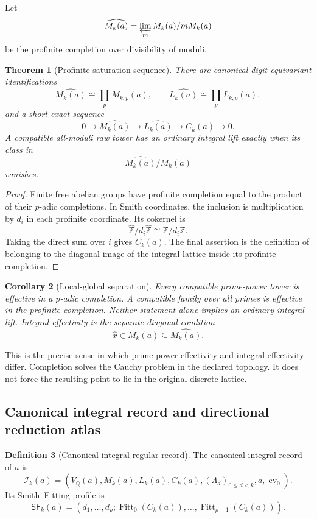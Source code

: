 \documentclass[11pt]{article}
\newtheorem{theorem}{Theorem}[section]
\newtheorem{corollary}[theorem]{Corollary}
\theoremstyle{definition}
\newtheorem{definition}[theorem]{Definition}
\theoremstyle{remark}
\begin{document}
Let
\[
\widehat{M_k(a)}
=
\varprojlim_m M_k(a)/mM_k(a)
\]
be the profinite completion over divisibility of moduli.

\begin{theorem}[Profinite saturation sequence]
\label{thm:block06-profinite}
There are canonical digit-equivariant identifications
\[
\widehat{M_k(a)}
\cong
\prod_p M_{k,p}(a),
\qquad
\widehat{L_k(a)}
\cong
\prod_p L_{k,p}(a),
\]
and a short exact sequence
\[
0
\longrightarrow
\widehat{M_k(a)}
\longrightarrow
\widehat{L_k(a)}
\longrightarrow
C_k(a)
\longrightarrow
0.
\]
A compatible all-moduli raw tower has an ordinary integral lift exactly when its class in
\[
\widehat{M_k(a)}/M_k(a)
\]
vanishes.
\end{theorem}

\begin{proof}
Finite free abelian groups have profinite completion equal to the product of their \(p\)-adic completions.  In Smith coordinates, the inclusion is multiplication by \(d_i\) in each profinite coordinate.  Its cokernel is
\[
\widehat{\mathbb Z}/d_i\widehat{\mathbb Z}
\cong
\mathbb Z/d_i\mathbb Z.
\]
Taking the direct sum over \(i\) gives \(C_k(a)\).  The final assertion is the definition of belonging to the diagonal image of the integral lattice inside its profinite completion.
\end{proof}

\begin{corollary}[Local-global separation]
\label{cor:block06-local-global}
Every compatible prime-power tower is effective in a \(p\)-adic completion.  A compatible family over all primes is effective in the profinite completion.  Neither statement alone implies an ordinary integral lift.  Integral effectivity is the separate diagonal condition
\[
\widehat{x}\in M_k(a)\subseteq\widehat{M_k(a)}.
\]
\end{corollary}

This is the precise sense in which prime-power effectivity and integral effectivity differ.  Completion solves the Cauchy problem in the declared topology.  It does not force the resulting point to lie in the original discrete lattice.

\subsection{Canonical integral record and directional reduction atlas}

\begin{definition}[Canonical integral regular record]
\label{def:block06-integral-record}
The canonical integral record of \(a\) is
\[
\mathcal I_k(a)
=
\left(
V_{\mathbb Q}(a),
M_k(a),
L_k(a),
C_k(a),
(\Lambda_d)_{0\leq d<k},
a,
\operatorname{ev}_0
\right).
\]
Its Smith--Fitting profile is
\[
\mathsf{SF}_k(a)
=
\left(
d_1,\ldots,d_\rho;
\operatorname{Fitt}_0(C_k(a)),\ldots,
\operatorname{Fitt}_{\rho-1}(C_k(a))
\right).
\]
\end{definition}
\end{document}
